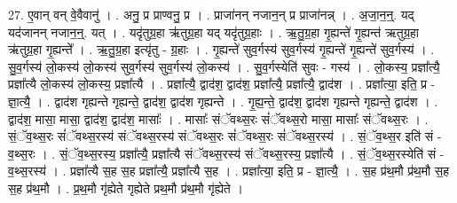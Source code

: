 \documentclass[17pt]{extarticle}
\begin{document}
27. ए॒वान् वन् वे॒वैवानु॑ । . अनु॒ प्र प्राण्वनु॒ प्र । . प्राजा॑नन् नजान॒न् प्र प्राजा॑नन्न् । . अ॒जा॒न॒न्॒. यद् यद॑जानन् नजान॒न्॒. यत् । . यदृ॑तुग्र॒हा ऋ॑तुग्र॒हा यद् यदृ॑तुग्र॒हाः । . ऋ॒तु॒ग्र॒हा गृ॒ह्यन्ते॑ गृ॒ह्यन्त॑ ऋतुग्र॒हा ऋ॑तुग्र॒हा गृ॒ह्यन्ते᳚ । . ऋ॒तु॒ग्र॒हा इत्यृ॑तु - ग्र॒हाः । . गृ॒ह्यन्ते॑ सुव॒र्गस्य॑ सुव॒र्गस्य॑ गृ॒ह्यन्ते॑ गृ॒ह्यन्ते॑ सुव॒र्गस्य॑ । . सु॒व॒र्गस्य॑ लो॒कस्य॑ लो॒कस्य॑ सुव॒र्गस्य॑ सुव॒र्गस्य॑ लो॒कस्य॑ । . सु॒व॒र्गस्येति॑ सुवः - गस्य॑ । . लो॒कस्य॒ प्रज्ञा᳚त्यै॒ प्रज्ञा᳚त्यै लो॒कस्य॑ लो॒कस्य॒ प्रज्ञा᳚त्यै । . प्रज्ञा᳚त्यै॒ द्वाद॑श॒ द्वाद॑श॒ प्रज्ञा᳚त्यै॒ प्रज्ञा᳚त्यै॒ द्वाद॑श । . प्रज्ञा᳚त्या॒ इति॒ प्र - ज्ञा॒त्यै॒ । . द्वाद॑श गृह्यन्ते गृह्यन्ते॒ द्वाद॑श॒ द्वाद॑श गृह्यन्ते । . गृ॒ह्य॒न्ते॒ द्वाद॑श॒ द्वाद॑श गृह्यन्ते गृह्यन्ते॒ द्वाद॑श । . द्वाद॑श॒ मासा॒ मासा॒ द्वाद॑श॒ द्वाद॑श॒ मासाः᳚ । . मासाः᳚ संॅवथ्स॒रः सं॑ॅवथ्स॒रो मासा॒ मासाः᳚ संॅवथ्स॒रः । . सं॒ॅव॒थ्स॒रः सं॑ॅवथ्स॒रस्य॑ संॅवथ्स॒रस्य॑ संॅवथ्स॒रः सं॑ॅवथ्स॒रः सं॑ॅवथ्स॒रस्य॑ । . सं॒ॅव॒थ्स॒र इति॑ सं - व॒थ्स॒रः । . सं॒ॅव॒थ्स॒रस्य॒ प्रज्ञा᳚त्यै॒ प्रज्ञा᳚त्यै संॅवथ्स॒रस्य॑ संॅवथ्स॒रस्य॒ प्रज्ञा᳚त्यै । . सं॒ॅव॒थ्स॒रस्येति॑ सं - व॒थ्स॒रस्य॑ । . प्रज्ञा᳚त्यै स॒ह स॒ह प्रज्ञा᳚त्यै॒ प्रज्ञा᳚त्यै स॒ह । . प्रज्ञा᳚त्या॒ इति॒ प्र - ज्ञा॒त्यै॒ । . स॒ह प्र॑थ॒मौ प्र॑थ॒मौ स॒ह स॒ह प्र॑थ॒मौ । . प्र॒थ॒मौ गृ॑ह्येते गृह्येते प्रथ॒मौ प्र॑थ॒मौ गृ॑ह्येते । \newline
\end{document}
